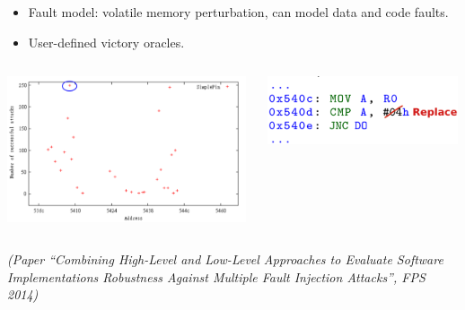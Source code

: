 \documentclass[final]{beamer}
\begin{document}
\begin{frame}[fragile]{}
\begin{tcolorbox}[adjusted title={\centering \Large Fault simulators}]
\begin{columns}[t]
\begin{column}{0.31\linewidth}
\begin{tcolorbox}
\begin{itemize}
\item Fault model: volatile memory perturbation, can model data and code faults.
\item User-defined victory oracles.
	\vspace{4mm}
    \end{itemize}
    \begin{columns}
    \begin{column}{0.50\linewidth}
	    \centering \includegraphics[width=0.99\textwidth]{img/celtic_output}
    \end{column}
    \begin{column}{0.50\linewidth}
	    \centering \includegraphics[width=0.99\textwidth]{img/code_excerpt}
    \end{column}
    \end{columns}
    \end{tcolorbox}
    \end{column}
    \end{columns}
    \end{tcolorbox}

    \vfill
    \vspace{-1cm}
    \begin{columns}[t]
      \begin{column}{.49\textwidth}
        \begin{tcolorbox}[adjusted title={\centering \Large Combining high-level and
        low-level simulations}]
        {\em \tiny(Paper “Combining High-Level and Low-Level Approaches to Evaluate
Software Implementations Robustness Against Multiple Fault Injection Attacks”,
FPS 2014)}


\end{tcolorbox}
\end{column}
\end{columns}
\end{frame}
\end{document}
